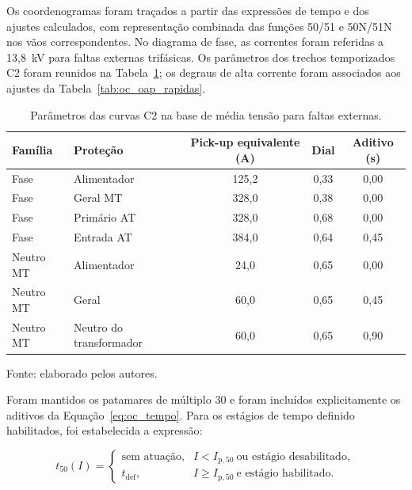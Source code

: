 Os coordenogramas foram traçados a partir das expressões de tempo e dos ajustes calculados, com representação combinada das funções 50/51 e 50N/51N nos vãos correspondentes. No diagrama de fase, as correntes foram referidas a 13,8~kV para faltas externas trifásicas. Os parâmetros dos trechos temporizados C2 foram reunidos na Tabela~\ref{tab:oc_bases_curvas}; os degraus de alta corrente foram associados aos ajustes da Tabela~\ref{tab:oc_oap_rapidas}.

\begin{table}[htbp]
    \centering
    \caption{Parâmetros das curvas C2 na base de média tensão para faltas externas.}
    \label{tab:oc_bases_curvas}
    \begin{tabular}{llccc}
        \hline
        \textbf{Família} & \textbf{Proteção} & \textbf{Pick-up equivalente (A)} & \textbf{Dial} & \textbf{Aditivo (s)}\\
        \hline
        Fase & Alimentador & 125,2 & 0,33 & 0,00\\
        Fase & Geral MT & 328,0 & 0,38 & 0,00\\
        Fase & Primário AT & 328,0 & 0,68 & 0,00\\
        Fase & Entrada AT & 384,0 & 0,64 & 0,45\\
        Neutro MT & Alimentador & 24,0 & 0,65 & 0,00\\
        Neutro MT & Geral & 60,0 & 0,65 & 0,45\\
        Neutro MT & Neutro do transformador & 60,0 & 0,65 & 0,90\\
        \hline
    \end{tabular}
    \par\vspace{2pt}
    {\small Fonte: elaborado pelos autores.}
\end{table}

Foram mantidos os patamares de múltiplo 30 e foram incluídos explicitamente os aditivos da Equação~\eqref{eq:oc_tempo}. Para os estágios de tempo definido habilitados, foi estabelecida a expressão:

\begin{equation}
    t_{50}(I)=
    \begin{cases}
        \text{sem atuação},& I<I_{\mathrm{p},50}\ \text{ou estágio desabilitado},\\
        t_{\mathrm{def}},& I\geq I_{\mathrm{p},50}\ \text{e estágio habilitado}.
    \end{cases}
    \label{eq:oc_tdef}
\end{equation}

